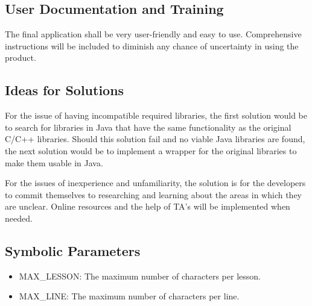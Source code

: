 \documentclass[12pt, titlepage]{article}
\begin{document}
\subsection{User Documentation and Training}
\indent \indent The final application shall be very user-friendly and easy to use. Comprehensive instructions will be included to diminish any chance of uncertainty in using the product.

\subsection{Ideas for Solutions}
\indent \indent For the issue of having incompatible required libraries, the first solution would be to search for libraries in Java that have the same functionality as the original C/C++ libraries. Should this solution fail and no viable Java libraries are found, the next solution would be to implement a wrapper for the original libraries to make them usable in Java.

\indent For the issues of inexperience and unfamiliarity, the solution is for the developers to commit themselves to researching and learning about the areas in which they are unclear. Online resources and the help of TA's will be implemented when needed.

\newpage

\subsection{Symbolic Parameters} \label{symbols}

\begin{itemize}
\item MAX\_LESSON: The maximum number of characters per lesson.
\item MAX\_LINE: The maximum number of characters per line.
\end{itemize}
\end{document}
